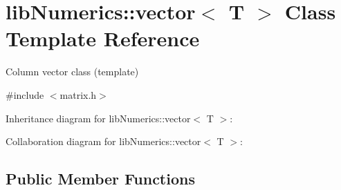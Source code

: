 \hypertarget{classlibNumerics_1_1vector}{}\section{lib\+Numerics\+:\+:vector$<$ T $>$ Class Template Reference}
\label{classlibNumerics_1_1vector}


Column vector class (template)  




{\ttfamily \#include $<$matrix.\+h$>$}



Inheritance diagram for lib\+Numerics\+:\+:vector$<$ T $>$\+:


Collaboration diagram for lib\+Numerics\+:\+:vector$<$ T $>$\+:
\subsection*{Public Member Functions}
